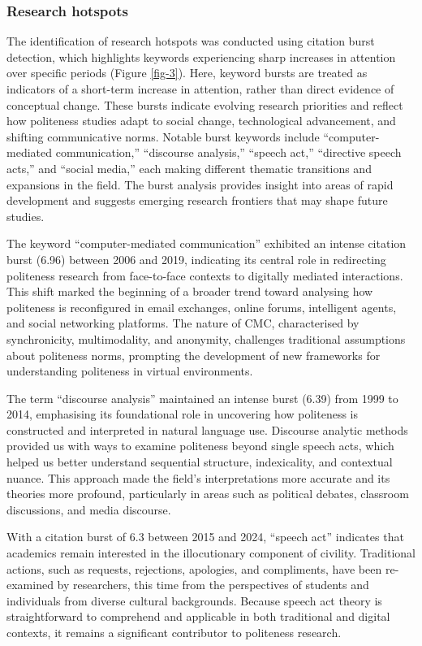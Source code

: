 \documentclass[english]{textolivre}
\begin{document}
\subsubsection{Research hotspots}
The identification of research hotspots was conducted using citation burst detection, which highlights keywords experiencing sharp increases in attention over specific periods (Figure \ref{fig-3}). Here, keyword bursts are treated as indicators of a short-term increase in attention, rather than direct evidence of conceptual change. These bursts indicate evolving research priorities and reflect how politeness studies adapt to social change, technological advancement, and shifting communicative norms. Notable burst keywords include ``computer-mediated communication,'' ``discourse analysis,'' ``speech act,'' ``directive speech acts,'' and ``social media,'' each making different thematic transitions and expansions in the field. The burst analysis provides insight into areas of rapid development and suggests emerging research frontiers that may shape future studies.

The keyword ``computer-mediated communication'' exhibited an intense citation burst (6.96) between 2006 and 2019, indicating its central role in redirecting politeness research from face-to-face contexts to digitally mediated interactions. This shift marked the beginning of a broader trend toward analysing how politeness is reconfigured in email exchanges, online forums, intelligent agents, and social networking platforms. The nature of CMC, characterised by synchronicity, multimodality, and anonymity, challenges traditional assumptions about politeness norms, prompting the development of new frameworks for understanding politeness in virtual environments.

The term ``discourse analysis'' maintained an intense burst (6.39) from 1999 to 2014, emphasising its foundational role in uncovering how politeness is constructed and interpreted in natural language use. Discourse analytic methods provided us with ways to examine politeness beyond single speech acts, which helped us better understand sequential structure, indexicality, and contextual nuance. This approach made the field’s 
interpretations more accurate and its theories more profound, particularly in areas such as political debates, classroom discussions, and media discourse.

With a citation burst of 6.3 between 2015 and 2024, ``speech act'' indicates that academics remain interested in the illocutionary component of civility. Traditional actions, such as requests, rejections, apologies, and compliments, have been re-examined by researchers, this time from the perspectives of students and individuals from diverse cultural backgrounds. Because speech act theory is straightforward to comprehend and applicable in both traditional and digital contexts, it remains a significant contributor to politeness research.
\end{document}
